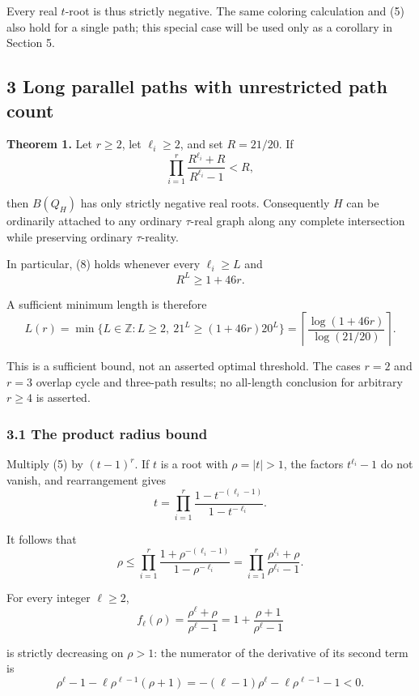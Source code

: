 \documentclass[
  11pt,
  a4paper,
]{article}
\begin{document}
Every real \(t\)-root is thus strictly negative. The same coloring
calculation and (5) also hold for a single path; this special case will
be used only as a corollary in Section 5.

\subsection{3 Long parallel paths with unrestricted path
count}\label{long-parallel-paths-with-unrestricted-path-count}

\textbf{Theorem 1.} Let \(r\geq2\), let \(\ell_i\geq2\), and set
\(R=21/20\). If
\nopagebreak
\[
\prod_{i=1}^r\frac{R^{\ell_i}+R}{R^{\ell_i}-1}<R,\tag{8}
\]

then \(B(Q_H)\) has only strictly negative real roots. Consequently
\(H\) can be ordinarily attached to any ordinary \(\tau\)-real graph
along any complete intersection while preserving ordinary
\(\tau\)-reality.

In particular, (8) holds whenever every \(\ell_i\geq L\) and
\nopagebreak
\[
R^L\geq1+46r.
\]

A sufficient minimum length is therefore
\nopagebreak
\[
L(r)=\min\{L\in\mathbb Z:L\geq2,\ 21^L\geq(1+46r)20^L\}
=\left\lceil\frac{\log(1+46r)}{\log(21/20)}\right\rceil.\tag{9}
\]

This is a sufficient bound, not an asserted optimal threshold. The cases
\(r=2\) and \(r=3\) overlap cycle and three-path results; no all-length
conclusion for arbitrary \(r\geq4\) is asserted.

\subsubsection{3.1 The product radius
bound}\label{the-product-radius-bound}

Multiply (5) by \((t-1)^r\). If \(t\) is a root with \(\rho=|t|>1\), the
factors \(t^{\ell_i}-1\) do not vanish, and rearrangement gives
\nopagebreak
\[
t=\prod_{i=1}^r
\frac{1-t^{-(\ell_i-1)}}{1-t^{-\ell_i}}.
\]

It follows that
\nopagebreak
\[
\rho\leq\prod_{i=1}^r
\frac{1+\rho^{-(\ell_i-1)}}{1-\rho^{-\ell_i}}
=\prod_{i=1}^r\frac{\rho^{\ell_i}+\rho}{\rho^{\ell_i}-1}.\tag{10}
\]

For every integer \(\ell\geq2\),
\nopagebreak
\[
f_\ell(\rho)=\frac{\rho^\ell+\rho}{\rho^\ell-1}
=1+\frac{\rho+1}{\rho^\ell-1}
\]

is strictly decreasing on \(\rho>1\): the numerator of the derivative of
its second term is
\nopagebreak
\[
\rho^\ell-1-\ell\rho^{\ell-1}(\rho+1)
=-(\ell-1)\rho^\ell-\ell\rho^{\ell-1}-1<0.
\]
\end{document}
